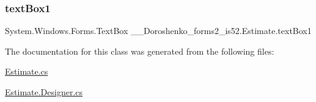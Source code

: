 \subsubsection{\texorpdfstring{text\+Box1}{textBox1}}
{\footnotesize\ttfamily System.\+Windows.\+Forms.\+Text\+Box \+\_\+\_\+\+Doroshenko\+\_\+forms2\+\_\+is52.\+Estimate.\+text\+Box1\hspace{0.3cm}{\ttfamily [private]}}



The documentation for this class was generated from the following files\+:\begin{DoxyCompactItemize}
\item 
\hyperlink{_estimate_8cs}{Estimate.\+cs}\item 
\hyperlink{_estimate_8_designer_8cs}{Estimate.\+Designer.\+cs}\end{DoxyCompactItemize}
